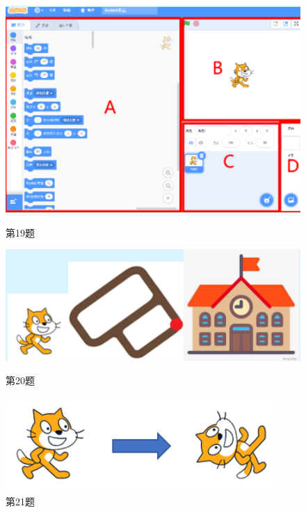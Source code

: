\documentclass[10.5pt, a4paper]{article}
\begin{document}
\begin{enumerate}
        \begin{figure}[htbp]
            \centering
            \begin{minipage}[t]{.15\textwidth}
                \centering
                \includegraphics[width=\textwidth]{19.png}
                \caption*{第19题}
            \end{minipage}
            \begin{minipage}[t]{.23\textwidth}
                \centering
                \includegraphics[width=\textwidth]{20.png}
                \caption*{第20题}
            \end{minipage}
            \begin{minipage}[t]{.27\textwidth}
                \centering
                \includegraphics[width=\textwidth]{21.png}
                \caption*{第21题}
            \end{minipage}
        \end{figure}


\end{enumerate}
\end{document}
